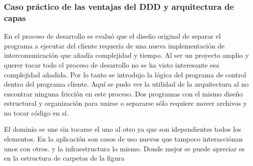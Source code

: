 \subsubsection{Caso práctico de las ventajas del DDD y arquitectura de capas}

En el proceso de desarrollo se evaluó que el diseño original de separar el programa a ejecutar del cliente requería de una nueva implementación de intercomunicación que añadía complejidad y tiempo. Al ser un proyecto amplio y querer tocar todo el proceso de desarrollo no se ha visto interesante esa complejidad añadida. Por lo tanto se introdujo la lógica del programa de control dentro del programa cliente. Aquí se pudo ver la utilidad de la arquitectura al no encontrar ninguna fricción en este proceso. Dos programas con el mismo diseño estructural y organización para unirse o separarse sólo requiere mover archivos y no tocar código en sí.

El dominio se une sin tocarse el uno al otro ya que son idependientes todos los elementos. En la aplicación son casos de uso nuevos que tampoco interacciónan unos con otros. y la infraestructura lo mismo. Donde mejor se puede apreciar es en la estructura de carpetas de la figura

